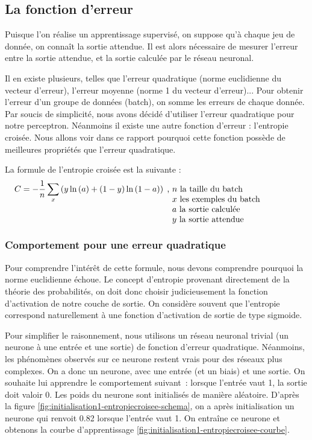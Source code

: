 \subsection{La fonction d'erreur}

Puisque l'on réalise un apprentissage supervisé, on suppose qu'à chaque jeu de donnée, on connaît la sortie attendue. Il est alors nécessaire
de mesurer l'erreur entre la sortie attendue, et la sortie calculée par le réseau neuronal.

Il en existe plusieurs, telles que l'erreur quadratique (norme euclidienne du vecteur d'erreur), l'erreur moyenne (norme 1 du vecteur d'erreur)... 
Pour obtenir l'erreur d'un groupe de données (batch), on somme les erreurs de chaque donnée. Par soucis de simplicité, nous avons décidé d'utiliser
l'erreur quadratique pour notre perceptron. Néanmoins il existe une autre fonction d'erreur : l'entropie croisée. Nous allons voir dans ce rapport pourquoi 
cette fonction possède de meilleures propriétés que l'erreur quadratique.

La formule de l'entropie croisée est la suivante : 
\begin{equation}
 C = -\frac{1}{n}\sum_x\left(y\ln\left(a\right) + \left(1-y\right)\ln\left(1-a\right)\right)\; \text{, \parbox[t]{15em}{$n$ la taille du batch\\ $x$ les exemples du batch\\
 $a$ la sortie calculée\\$y$ la sortie attendue}}
 \label{eq:formule-entropiecroisee}
\end{equation}

\subsubsection{Comportement pour une erreur quadratique}

Pour comprendre l'intérêt de cette formule, nous devons comprendre pourquoi la norme euclidienne échoue. Le concept d'entropie provenant 
directement de la théorie des probabilités, on doit donc choisir judicieusement la fonction d'activation de notre couche de sortie. On 
considère souvent que l'entropie correspond naturellement à une fonction d'activation de sortie de type sigmoide. 

Pour simplifier le raisonnement, nous utilisons un réseau neuronal trivial (un neurone à une entrée et une sortie) de fonction d'erreur quadratique. 
Néanmoins, les phénomènes observés sur ce neurone restent vrais pour des réseaux plus complexes. On a donc un neurone, avec une entrée (et un biais) et 
une sortie. On souhaite lui apprendre le comportement suivant~: lorsque l'entrée vaut 1, la sortie doit valoir 0.
Les poids du neurone sont initialisés de manière aléatoire. D'après la figure \ref{fig:initialisation1-entropiecroisee-schema}, on a après initialisation 
un neurone qui renvoit 0.82 lorsque l'entrée vaut 1. On entraîne ce neurone et obtenons la courbe d'apprentissage 
\ref{fig:initialisation1-entropiecroisee-courbe}.


